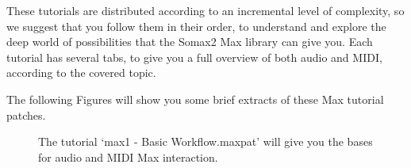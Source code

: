 These tutorials are distributed according to an incremental level of complexity, so we suggest that you follow them in their order, to understand and explore the deep world of possibilities that the Somax2 Max library can give you.
Each tutorial has several tabs, to give you a full overview of both audio and MIDI, according to the covered topic.

The following Figures will show you some brief extracts of these Max tutorial patches.




\begin{figure}[H]
  \centering
  \hfill
  \caption{The tutorial `max1 - Basic Workflow.maxpat' will give you the bases for audio and MIDI Max interaction.}
\end{figure}

